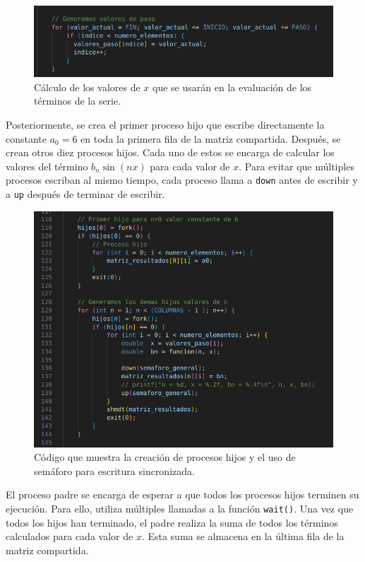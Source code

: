 {\begin{figure}[H]
    \centering
    \includegraphics[width=0.9\linewidth]{Figures/codigo/x_values.png}
    \caption[Generación de valores de \(x\)]{Cálculo de los valores de \(x\) que se usarán en la evaluación de los términos de la serie.}
    \label{fig:x-values}
\end{figure}

Posteriormente, se crea el primer proceso hijo que escribe directamente la constante \( a_0 = 6 \) en toda la primera fila de la matriz compartida. Después, se crean otros diez procesos hijos. Cada uno de estos se encarga de calcular los valores del término \( b_n \sin(nx) \) para cada valor de \( x \). Para evitar que múltiples procesos escriban al mismo tiempo, cada proceso llama a \texttt{down} antes de escribir y a \texttt{up} después de terminar de escribir.

\begin{figure}[H]
    \centering
    \includegraphics[width=0.9\linewidth]{Figures/codigo/procesos_hijos.png}
    \caption[Creación y sincronización de procesos]{Código que muestra la creación de procesos hijos y el uso de semáforo para escritura sincronizada.}
    \label{fig:procesos-hijos}
\end{figure}


El proceso padre se encarga de esperar a que todos los procesos hijos terminen su ejecución. Para ello, utiliza múltiples llamadas a la función \texttt{wait()}. Una vez que todos los hijos han terminado, el padre realiza la suma de todos los términos calculados para cada valor de \( x \). Esta suma se almacena en la última fila de la matriz compartida.

}

